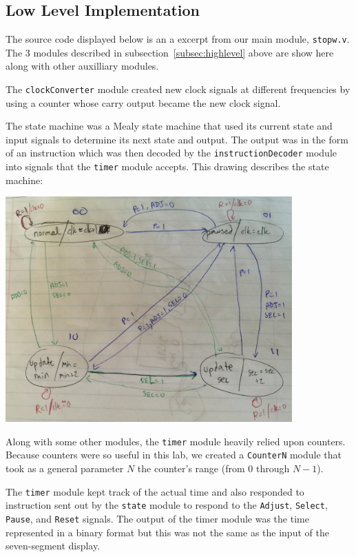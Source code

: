 \documentclass[]{article}
\begin{document}
\subsection{Low Level Implementation}

The source code displayed below is an a excerpt from our main module, \texttt{stopw.v}. The 3 modules described in subsection~\ref{subsec:highlevel} above are show here along with other auxilliary modules.



The \texttt{clockConverter} module created new clock signals at different frequencies by using a counter whose carry output became the new clock signal.

The state machine was a Mealy state machine that used its current state and input signals to determine its next state and output. The output was in the form of an instruction which was then decoded by the \texttt{instructionDecoder} module into signals that the \texttt{timer} module accepts. This drawing describes the state machine:

\includegraphics[width=11cm]{state_diagram.jpeg}

Along with some other modules, the \texttt{timer} module heavily relied upon counters. Because counters were so useful in this lab, we created a \texttt{CounterN} module that took as a general parameter $N$ the counter's range (from $0$ through $N - 1$).



The \texttt{timer} module kept track of the actual time and also responded to instruction sent out by the \texttt{state} module to respond to the \texttt{Adjust}, \texttt{Select}, \texttt{Pause}, and \texttt{Reset} signals. The output of the timer module was the time represented in a binary format but this was not the same as the input of the seven-segment display.
\end{document}
